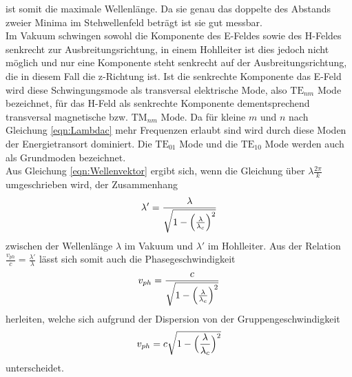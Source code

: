 ist somit die maximale Wellenlänge. Da sie genau das doppelte des Abstands zweier Minima im Stehwellenfeld
beträgt ist sie gut messbar. \\
Im Vakuum schwingen sowohl die Komponente des E-Feldes sowie des H-Feldes senkrecht zur Ausbreitungsrichtung, in
einem Hohlleiter ist dies jedoch nicht möglich und nur eine Komponente steht senkrecht auf der Ausbreitungsrichtung,
die in diesem Fall die z-Richtung ist. Ist die senkrechte Komponente das E-Feld wird diese Schwingungsmode
als transversal elektrische Mode, also $\text{TE}_{nm}$ Mode bezeichnet, für das H-Feld als senkrechte
Komponente dementsprechend transversal magnetische bzw. $\text{TM}_{nm}$ Mode. Da für kleine
$m$ und $n$ nach Gleichung \ref{eqn:Lambdac} mehr Frequenzen erlaubt sind wird durch diese Moden der Energietransort
dominiert. Die $\text{TE}_{01}$ Mode und die $\text{TE}_{10}$ Mode werden auch als Grundmoden
bezeichnet. \\
Aus Gleichung \ref{eqn:Wellenvektor} ergibt sich, wenn die Gleichung über $\lambda\frac{2\pi}{k}$
umgeschrieben wird, der Zusammenhang
\begin{equation}
  \lambda'=\frac{\lambda}{\sqrt{1-\Bigl(\frac{\lambda}{\lambda_c}\Bigr)^2}}
  \label{eqn:zsmhl}
\end{equation}
zwischen der Wellenlänge $\lambda$ im Vakuum und $\lambda'$ im Hohlleiter.
Aus der Relation $\frac{v_{ph}}{c}=\frac{\lambda'}{\lambda}$ lässt sich somit auch die Phasegeschwindigkeit
\begin{equation}
  v_{ph}=\frac{c}{\sqrt{1-\Bigl(\frac{\lambda}{\lambda_c}\Bigr)^2}}
  \label{eqn:vphase}
\end{equation}
herleiten, welche sich aufgrund der Dispersion von der Gruppengeschwindigkeit
\begin{equation}
    v_{ph}=c\sqrt{1-\Bigl(\frac{\lambda}{\lambda_c}\Bigr)^2}
  \label{eqn:vgruppe}
\end{equation}
unterscheidet.

